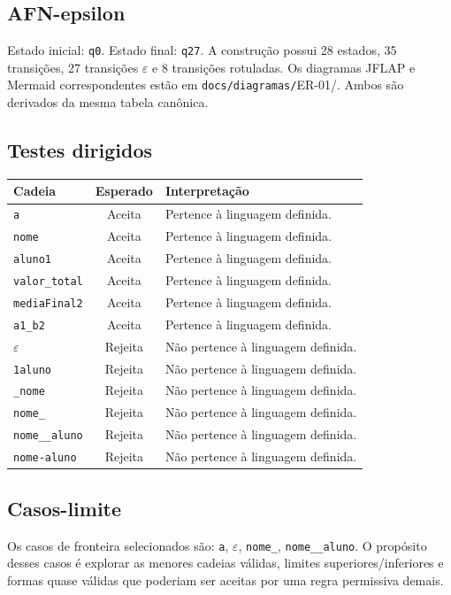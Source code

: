 \subsection{AFN-epsilon}
Estado inicial: \texttt{q0}. Estado final: \texttt{q27}. A construção possui 28 estados, 35 transições, 27 transições $\varepsilon$ e 8 transições rotuladas.
Os diagramas JFLAP e Mermaid correspondentes estão em \texttt{docs/diagramas/}ER-01/. Ambos são derivados da mesma tabela canônica.
\subsection{Testes dirigidos}
\begin{center}
\small
\begin{tabular}{|p{}|c|p{}|}
\toprule
Cadeia & Esperado & Interpretação \\
\midrule
\texttt{a} & Aceita & Pertence à linguagem definida. \\
\texttt{nome} & Aceita & Pertence à linguagem definida. \\
\texttt{aluno1} & Aceita & Pertence à linguagem definida. \\
\texttt{valor\_total} & Aceita & Pertence à linguagem definida. \\
\texttt{mediaFinal2} & Aceita & Pertence à linguagem definida. \\
\texttt{a1\_b2} & Aceita & Pertence à linguagem definida. \\
$\varepsilon$ & Rejeita & Não pertence à linguagem definida. \\
\texttt{1aluno} & Rejeita & Não pertence à linguagem definida. \\
\texttt{\_nome} & Rejeita & Não pertence à linguagem definida. \\
\texttt{nome\_} & Rejeita & Não pertence à linguagem definida. \\
\texttt{nome\_\_aluno} & Rejeita & Não pertence à linguagem definida. \\
\texttt{nome-aluno} & Rejeita & Não pertence à linguagem definida. \\
\bottomrule
\end{tabular}
\end{center}
\subsection{Casos-limite}
Os casos de fronteira selecionados são: \texttt{a}, $\varepsilon$, \texttt{nome\_}, \texttt{nome\_\_aluno}.
\medskip
O propósito desses casos é explorar as menores cadeias válidas, limites superiores/inferiores e formas quase válidas que poderiam ser aceitas por uma regra permissiva demais.
